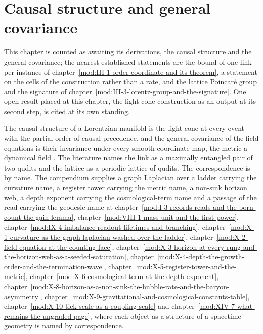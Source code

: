 \section{Causal structure and general covariance}\label{mod:III-8-causal-structure-and-general-covariance}
\begin{chtable}
This chapter is counted as awaiting its derivations, the causal structure and the general covariance; the nearest established statements are the bound of one link per instance of chapter~\ref{mod:III-1-order-coordinate-and-its-theorem}, a statement on the cells of the construction rather than a rate, and the lattice Poincar\'e group and the signature of chapter~\ref{mod:III-3-lorentz-group-and-the-signature}. One open result placed at this chapter, the light-cone construction as an output at its second step, is cited at its own standing.
\end{chtable}
\chdeps{}{}
\begin{chbridge}The causal structure of a Lorentzian manifold is the light cone at every event with the partial order of causal precedence, and the general covariance of the field equations is their invariance under every smooth coordinate map, the metric a dynamical field \cite{Einstein1916,Wald1984}. The literature names the link as a maximally entangled pair of two qudits and the lattice as a periodic lattice of qudits. The correspondence is by name. The compendium supplies a graph Laplacian over a ladder carrying the curvature name, a register tower carrying the metric name, a non-sink horizon web, a depth exponent carrying the cosmological-term name and a passage of the read carrying the geodesic name at chapter~\ref{mod:I-3-records-reads-and-the-born-count-the-gain-lemma}, chapter~\ref{mod:VIII-1-mass-unit-and-the-first-power}, chapter~\ref{mod:IX-4-imbalance-readout-lifetimes-and-branching}, chapter~\ref{mod:X-1-curvature-as-the-graph-laplacian-washed-over-the-ladder}, chapter~\ref{mod:X-2-field-equation-at-the-counting-face}, chapter~\ref{mod:X-3-horizon-at-every-rung-and-the-horizon-web-as-a-seeded-saturation}, chapter~\ref{mod:X-4-depth-the-growth-order-and-the-termination-wave}, chapter~\ref{mod:X-5-register-tower-and-the-metric}, chapter~\ref{mod:X-6-cosmological-term-at-the-depth-exponent}, chapter~\ref{mod:X-8-horizon-as-a-non-sink-the-hubble-rate-and-the-baryon-asymmetry}, chapter~\ref{mod:X-9-gravitational-and-cosmological-constants-table}, chapter~\ref{mod:X-10-tick-scale-as-a-coupling-scale} and chapter~\ref{mod:XIV-7-what-remains-the-ungraded-page}, where each object as a structure of a spacetime geometry is named by correspondence.\end{chbridge}
